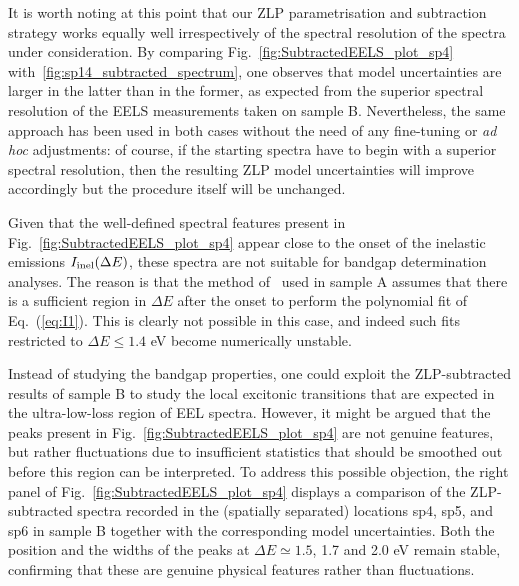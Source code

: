 It is worth noting at this point that our ZLP parametrisation and subtraction strategy works equally
well irrespectively of the spectral resolution of the spectra under consideration.
%
By comparing Fig.~\ref{fig:SubtractedEELS_plot_sp4} with~\ref{fig:sp14_subtracted_spectrum}, one observes
that  model uncertainties are larger in the latter than in the former, as expected from the
superior 
spectral resolution of the EELS measurements taken on sample B.
%
Nevertheless, the same approach has been used in both cases without the need of any fine-tuning
or {\it ad hoc} adjustments: of course, if the starting
spectra have to begin with a superior spectral resolution, then the resulting ZLP model uncertainties
will improve accordingly but the procedure itself will be unchanged.

Given that the
well-defined spectral features present in Fig.~\ref{fig:SubtractedEELS_plot_sp4}
appear close to the onset of the inelastic emissions $I_{\rm inel}(\Delta E)$,
these spectra are not suitable for bandgap determination analyses.
%
The reason is that the method of~\cite{Rafferty:2000}
used in sample A assumes that there is a sufficient  region in $\Delta E$
after the onset to perform the polynomial fit of Eq.~(\ref{eq:I1}).
%
This is clearly not possible in this case, and indeed such fits restricted to $\Delta E\le 1.4$ eV
become numerically unstable.

Instead of studying the bandgap properties, one could exploit the ZLP-subtracted results of sample B
to study the local
excitonic transitions that are expected in the ultra-low-loss region of EEL spectra.
%
However, it might be argued that the peaks present in Fig.~\ref{fig:SubtractedEELS_plot_sp4} are not
genuine features, but rather fluctuations due to insufficient statistics
that should be smoothed out before this region can be interpreted.
%
To address this possible objection, the right panel of Fig.~\ref{fig:SubtractedEELS_plot_sp4}
displays a
comparison of the ZLP-subtracted spectra recorded in the (spatially separated) locations sp4, sp5, and sp6
in sample B
together with the corresponding model uncertainties.
%
Both the position and the widths of the peaks at $\Delta E\simeq 1.5$,
1.7 and 2.0 eV remain stable, confirming that these
are genuine physical features rather than fluctuations.

